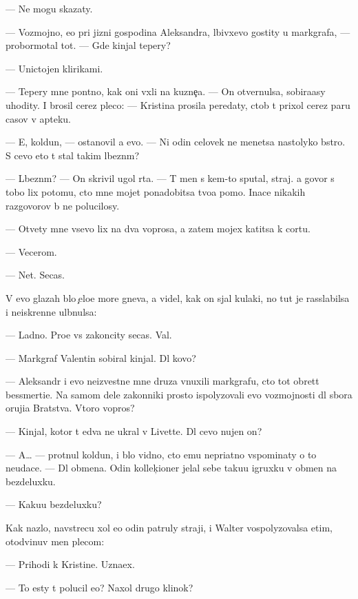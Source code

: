 \documentclass[10pt]{book}
\begin{document}
— Ne mogu skazaty.

— Vozmojno, {\y}e{\x}o pri jizni gospodina Aleksandra, l{\iu}bivxevo gostity u markgrafa, — probormotal tot. — Gde kinjal tepery?

— Unictojen klirikami.

— Tepery mne pon{\ia}tno, kak oni v{\yi}xli na kuzne{\c}a. — On otvernulsa, sobira{\y}asy uhodity. I brosil cerez pleco: — Kristina prosila peredaty, ctob{\yi} t{\yi} prixol cerez paru casov v apteku.

— E{\y}, koldun, — ostanovil {\y}a {\y}evo. — Ni odin celovek ne men{\ia}{\y}etsa nastolyko b{\yi}stro. S cevo eto t{\yi} stal takim l{\iu}bezn{\yi}m?

— L{\iu}bezn{\yi}m? — On skrivil ugol rta. — T{\yi} men{\ia} s kem-to sputal, straj. {\Y}a govor{\iu} s tobo{\y} lix potomu, cto mne mojet ponadobitsa tvo{\y}a pomo{\x}. Inace nikakih razgovorov b{\yi} ne polucilosy.

— Otvety mne vsevo lix na dva voprosa, a zatem mojex katitsa k cortu.

— Vecerom.

— Net. Se{\y}cas.

V {\y}evo glazah b{\yi}lo {\c}elo{\y}e more gneva, {\y}a videl, kak on sjal kulaki, no tut je rasslabilsa i neiskrenne ul{\yi}bnulsa:

— Ladno. Pro{\x}e vs{\e} zakoncity se{\y}cas. Val{\ia}{\y}.

— Markgraf Valentin sobiral kinjal{\yi}. Dl{\ia} kovo?

— Aleksandr i {\y}evo neizvestn{\yi}{\y}e mne druz{\y}a vnuxili markgrafu, cto tot obret{\e}t bessmerti{\y}e. Na samom dele zakonniki prosto ispolyzovali {\y}evo vozmojnosti dl{\ia} sbora oruji{\y}a Bratstva. Vtoro{\y} vopros?

— Kinjal, kotor{\yi}{\y} t{\yi} {\y}edva ne ukral v Livette. Dl{\ia} cevo nujen on?

— A… — prot{\ia}nul koldun, i b{\yi}lo vidno, cto {\y}emu nepri{\y}atno vspominaty o to{\y} neudace. — Dl{\ia} obmena. Odin kollek{\c}ioner jelal sebe taku{\y}u igruxku v obmen na bezdeluxku.

— Kaku{\y}u bezdeluxku?

Kak nazlo, navstrecu xol {\y}e{\x}o odin patruly straji, i Walter vospolyzovalsa etim, otodvinuv men{\ia} plecom:

— Prihodi k Kristine. Uzna{\y}ex.

— To {\y}esty t{\yi} polucil {\y}e{\y}o? Naxol drugo{\y} klinok?
\end{document}
